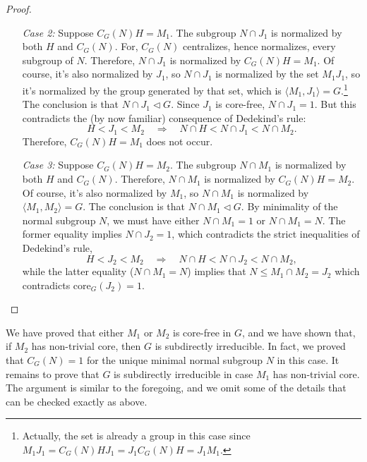 \documentclass[cm,dissertation,actual,final]{uhthesis}
\theoremstyle{plain}
\theoremstyle{definition}
\theoremstyle{remark}
\numberwithin{theorem}{section}
\numberwithin{claim}{chapter}
\numberwithin{equation}{section}
\numberwithin{conjecture}{chapter}
\newcommand{\<}{\ensuremath{\langle}}
\renewcommand{\>}{\ensuremath{\rangle}}
\renewcommand{\leq}{\ensuremath{\leqslant}}
\newcommand{\ssubnormal}{\ensuremath{\vartriangleleft}}
\newcommand{\core}{\ensuremath{\mathrm{core}}}
\newcommand{\0}{\ensuremath{\mathbf{0}}}
\newcommand{\1}{\ensuremath{\mathbf{1}}}
\newcommand{\2}{\ensuremath{\mathbf{2}}}
\newcommand{\3}{\ensuremath{\mathbf{3}}}
\newcommand{\4}{\ensuremath{\mathbf{4}}}
\newcommand{\5}{\ensuremath{\mathbf{5}}}
\begin{document}
\begin{proof}
\begin{enumerate}
\item[{\it Case 2:}]
Suppose $C_G(N)H =M_1$.  The subgroup $N\cap J_1$ is
normalized by both $H$ and $C_G(N)$. For, $C_G(N)$ centralizes, hence
normalizes, every subgroup of $N$.  Therefore, $N\cap J_1$ is normalized by 
$C_G(N)H =M_1$.  Of course, it's also normalized by $J_1$, so
$N\cap J_1$ is normalized by the set $M_1J_1$, so it's normalized by the group
generated by that set, which is $\<M_1, J_1\> = G$.\footnote{Actually, the set is
already a group in this case since $M_1J_1 = C_G(N)H J_1 = J_1 C_G(N)H = J_1 M_1$.}
The conclusion is that $N\cap J_1\ssubnormal G$.  
Since $J_1$ is core-free, $N\cap J_1 = 1$.
But this contradicts the (by now familiar) consequence of
Dedekind's rule:  
\[
H < J_1 < M_2  \quad \Rightarrow \quad N\cap H < N\cap J_1 < N\cap M_2.
\]
 Therefore, $C_G(N)H =M_1$ does not occur.

\item[{\it Case 3:}]
Suppose $C_G(N)H = M_2$.
The subgroup $N\cap M_1$ is
normalized by both $H$ and $C_G(N)$.  Therefore, $N\cap M_1$ is normalized by 
$C_G(N)H =M_2$.  Of course, it's also normalized by $M_1$, so
$N\cap M_1$ is normalized by $\<M_1, M_2\> = G$.
The conclusion is that $N\cap M_1\ssubnormal G$.  By 
minimality of the normal subgroup $N$, we must have either $N\cap M_1 = 1$ or 
$N\cap M_1 = N$.  The former equality implies $N\cap J_2=1$, which contradicts 
the strict inequalities of Dedekind's rule,
\begin{equation}
  \label{eq:6}
H < J_2 < M_2  \quad \Rightarrow \quad N\cap H < N\cap J_2 < N\cap M_2,
\end{equation}
while the latter equality ($N\cap M_1 = N$) implies that $N \leq M_1 \cap M_2 = J_2$ which
contradicts 
$\core_G(J_2)=1$. 
\end{enumerate}
\end{proof}

We have proved that either $M_1$ or $M_2$ is core-free in $G$, and
we have shown that, if $M_2$ has non-trivial core, then $G$ is subdirectly
irreducible.  In fact, we proved that $C_G(N)=1$ for the unique minimal normal subgroup
$N$ in this case.  It remains to prove that $G$ is subdirectly irreducible in
case $M_1$ has non-trivial core. The argument is similar to the foregoing, and
we omit some of the details that can be checked exactly as above.
\end{document}
